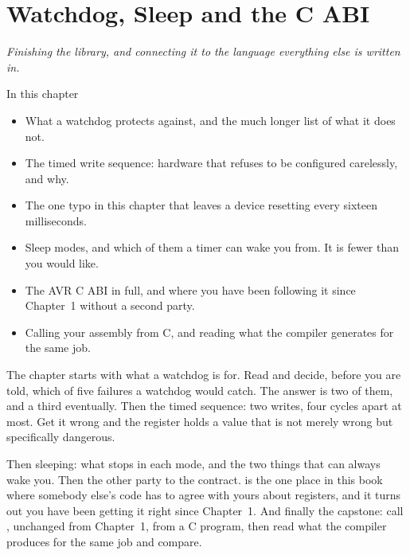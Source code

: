 
\chapter{Watchdog, Sleep and the C ABI}
\label{c6:ch:abi}

{\large\itshape Finishing the library, and connecting it to the language everything else is
written in.\par}

\begin{chapterbox}{In this chapter}
\begin{itemize}
  \item What a watchdog protects against, and the much longer list of what it does not.
  \item The timed write sequence: hardware that refuses to be configured carelessly, and why.
  \item The one typo in this chapter that leaves a device resetting every sixteen milliseconds.
  \item Sleep modes, and which of them a timer can wake you from. It is fewer than you would like.
  \item The AVR C ABI in full, and where you have been following it since Chapter~1 without a
    second party.
  \item Calling your assembly from C, and reading what the compiler generates for the same job.
\end{itemize}
\end{chapterbox}

The chapter starts with what a watchdog is for. Read  and decide, before
you are told, which of five failures a watchdog would catch. The answer is two of them, and a third
eventually. Then the timed sequence: two writes, four cycles apart at most. Get it wrong and the
register holds a value that is not merely wrong but specifically dangerous.

Then sleeping: what stops in each mode, and the two things that can always wake you. Then the
other party to the contract.  is the one place in this book where somebody
else's code has to agree with yours about registers, and it turns out you have been getting it
right since Chapter~1. And finally the capstone: call , unchanged from
Chapter~1, from a C program, then read what the compiler produces for the same job and compare.

